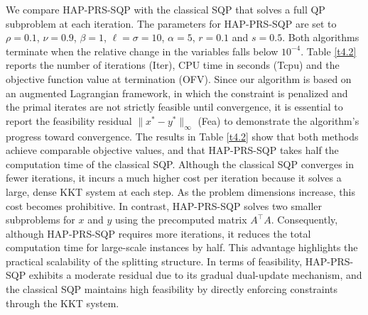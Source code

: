 \documentclass[pdflatex,sn-mathphys-num]{sn-jnl}%
\theoremstyle{thmstyleone}%
\theoremstyle{thmstyletwo}%
\theoremstyle{thmstylethree}%
\begin{document}
	We compare HAP-PRS-SQP with the classical SQP that solves a full QP subproblem at each iteration. The parameters for HAP-PRS-SQP are set to $\rho=0.1$, $\nu=0.9$, $\beta=1$, $\ell=\sigma=10$, $\alpha=5$, $r=0.1$ and $s=0.5$. Both algorithms terminate when the relative change in the variables falls below $10^{-4}$. 
	Table \ref{t4.2} reports the number of iterations (Iter), CPU time in seconds (Tcpu) and the objective function value at termination (OFV). Since our algorithm is based on an augmented Lagrangian framework, in which the constraint is penalized and the primal iterates are not strictly feasible until convergence, it is essential to report the feasibility residual $\|x^*-y^*\|_\infty$ (Fea) to demonstrate the algorithm's progress toward convergence.  
	The results in Table \ref{t4.2} show that both methods achieve comparable objective values, and that HAP-PRS-SQP takes half the computation time of the classical SQP. Although the classical SQP converges in fewer iterations, it incurs a much higher cost per iteration because it solves a large, dense KKT system at each step. As the problem dimensions increase, this cost becomes prohibitive. In contrast, HAP-PRS-SQP solves two smaller subproblems for $x$ and $y$ using the precomputed matrix $A^\top A$. Consequently, although HAP-PRS-SQP requires more iterations, it reduces the total computation time for large-scale instances by half. This advantage highlights the practical scalability of the splitting structure. 
	In terms of feasibility, HAP-PRS-SQP exhibits a moderate residual due to its gradual dual-update mechanism, and the classical SQP maintains high feasibility by directly enforcing constraints through the KKT system.
\end{document}
